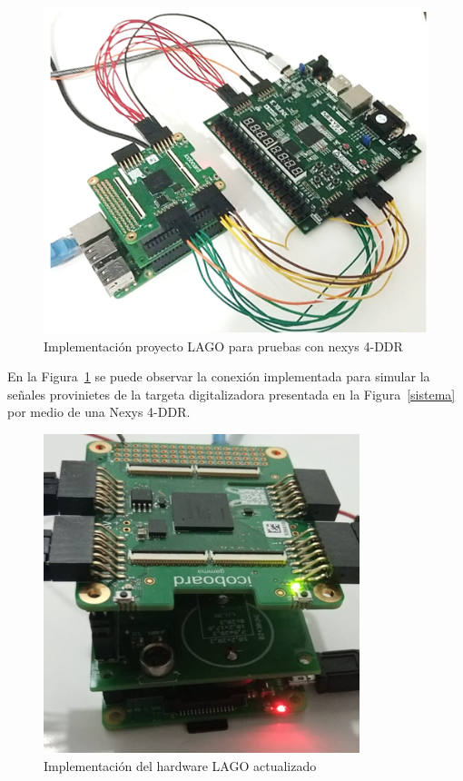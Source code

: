 \begin{figure}[H]
\includegraphics[scale=0.75]{Figs/lagofinal.PNG} 
\centering
\caption{Implementación proyecto LAGO para pruebas con nexys 4-DDR}
\label{nexys}
\end{figure}
En la Figura~\ref{nexys} se puede observar la conexión implementada para simular la señales provinietes de la targeta digitalizadora presentada en la Figura~\ref{sistema}  por medio de una Nexys 4-DDR.


\begin{figure}[H]
\includegraphics[scale=0.85]{Figs/icoboardfinal.PNG}
\centering
\caption{Implementación del hardware LAGO actualizado}
\label{lagofin}
\end{figure}

